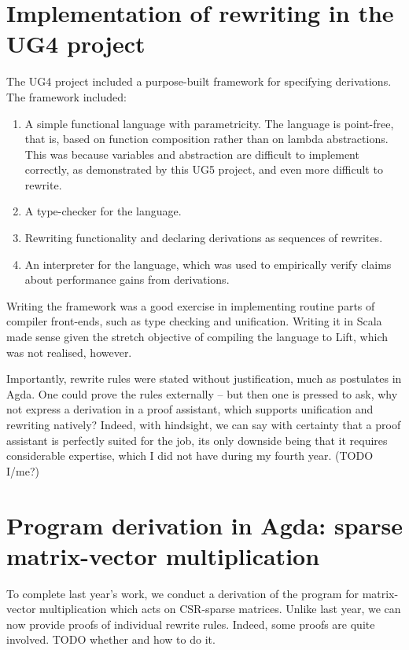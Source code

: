 \documentclass[bsc,frontabs,oneside,singlespacing,parskip,deptreport]{infthesis}
\theoremstyle{definition}
\theoremstyle{lemma}
\begin{document}
\section{Implementation of rewriting in the UG4 project}
\label{sec:impl-rewr-ug4}

The UG4 project included a purpose-built framework for specifying
derivations. The framework included:

\begin{enumerate}
\item A simple functional language with parametricity. The language is
point-free, that is, based on function composition rather than on
lambda abstractions. This was because variables and abstraction are
difficult to implement correctly, as demonstrated by this UG5 project,
and even more difficult to rewrite.

\item A type-checker for the language.

\item Rewriting functionality and declaring derivations as sequences of
  rewrites.

\item An interpreter for the language, which was used to empirically
  verify claims about performance gains from derivations.
\end{enumerate}

Writing the framework was a good exercise in implementing routine
parts of compiler front-ends, such as type checking and
unification. Writing it in Scala made sense given the stretch
objective of compiling the language to Lift, which was not realised,
however.

Importantly, rewrite rules were stated without justification, much as
postulates in Agda. One could prove the rules externally – but then
one is pressed to ask, why not express a derivation in a proof
assistant, which supports unification and rewriting natively? Indeed,
with hindsight, we can say with certainty that a proof assistant is
perfectly suited for the job, its only downside being that it requires
considerable expertise, which I did not have during my fourth
year. (TODO I/me?)

\section{Program derivation in Agda: sparse matrix-vector
  multiplication}
\label{sec:progr-deriv-agda}

To complete last year's work, we conduct a derivation of the program
for matrix-vector multiplication which acts on CSR-sparse
matrices. Unlike last year, we can now provide proofs of individual
rewrite rules. Indeed, some proofs are quite involved. TODO whether
and how to do it.
\end{document}
